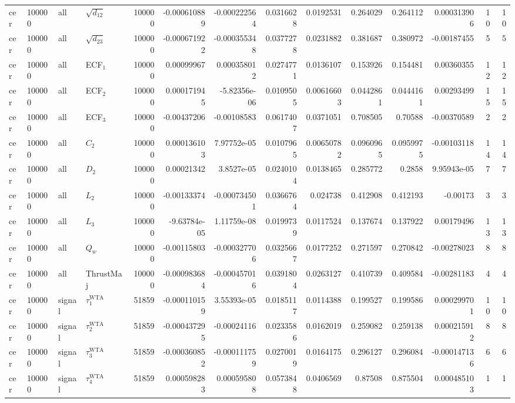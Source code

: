\begin{landscape}
\begin{longtable}{llll r rrrr rr r rr}
cer & 100000 & all & $\sqrt{d_{12}}$ & 100000 & -0.000610889 & -0.000222564 & 0.0316628 & 0.0192531 & 0.264029 & 0.264112 & 0.000313906 & 10 & 10 \\
cer & 100000 & all & $\sqrt{d_{23}}$ & 100000 & -0.000671922 & -0.000355348 & 0.0377278 & 0.0231882 & 0.381687 & 0.380972 & -0.00187455 & 5 & 5 \\
cer & 100000 & all & ECF$_1$ & 100000 & 0.00099967 & 0.000358012 & 0.0274771 & 0.0136107 & 0.153926 & 0.154481 & 0.00360355 & 12 & 12 \\
cer & 100000 & all & ECF$_2$ & 100000 & 0.000171945 & -5.82356e-06 & 0.0109505 & 0.00616603 & 0.0442861 & 0.0444161 & 0.00293499 & 15 & 15 \\
cer & 100000 & all & ECF$_3$ & 100000 & -0.00437206 & -0.00108583 & 0.0617407 & 0.0371051 & 0.708505 & 0.70588 & -0.00370589 & 2 & 2 \\
cer & 100000 & all & $C_2$ & 100000 & 0.000136103 & 7.97752e-05 & 0.0107965 & 0.00650782 & 0.0960965 & 0.0959975 & -0.00103118 & 14 & 14 \\
cer & 100000 & all & $D_2$ & 100000 & 0.00021342 & 3.8527e-05 & 0.0240104 & 0.0138465 & 0.285772 & 0.2858 & 9.95943e-05 & 7 & 7 \\
cer & 100000 & all & $L_2$ & 100000 & -0.00133374 & -0.000734501 & 0.0366764 & 0.024738 & 0.412908 & 0.412193 & -0.00173 & 3 & 3 \\
cer & 100000 & all & $L_3$ & 100000 & -9.63784e-05 & 1.11759e-08 & 0.0199739 & 0.0117524 & 0.137674 & 0.137922 & 0.00179496 & 13 & 13 \\
cer & 100000 & all & $Q_w$ & 100000 & -0.00115803 & -0.000327706 & 0.0325667 & 0.0177252 & 0.271597 & 0.270842 & -0.00278023 & 8 & 8 \\
cer & 100000 & all & ThrustMaj & 100000 & -0.000983684 & -0.000457016 & 0.0391804 & 0.0263127 & 0.410739 & 0.409584 & -0.00281183 & 4 & 4 \\
cer & 100000 & signal & $\tau_1^{\mathrm{WTA}}$ & 51859 & -0.000110159 & 3.55393e-05 & 0.0185117 & 0.0114388 & 0.199527 & 0.199586 & 0.000299701 & 10 & 10 \\
cer & 100000 & signal & $\tau_2^{\mathrm{WTA}}$ & 51859 & -0.000437295 & -0.00024116 & 0.0233586 & 0.0162019 & 0.259082 & 0.259138 & 0.000215912 & 8 & 8 \\
cer & 100000 & signal & $\tau_3^{\mathrm{WTA}}$ & 51859 & -0.000360852 & -0.000111759 & 0.0270019 & 0.0164175 & 0.296127 & 0.296084 & -0.000147136 & 6 & 6 \\
cer & 100000 & signal & $\tau_4^{\mathrm{WTA}}$ & 51859 & 0.000598283 & 0.000595808 & 0.0573848 & 0.0406569 & 0.87508 & 0.875504 & 0.000485103 & 1 & 1 \\

\end{longtable}
\end{landscape}
